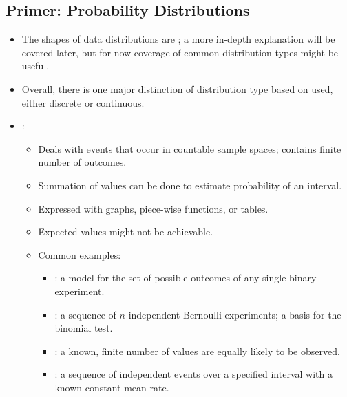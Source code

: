 \begin{itemize}
  \subsection{Primer: Probability Distributions}
  \begin{itemize}
    \item The shapes of data distributions are \hyperref[Subsection: Probability Functions]{}; a more in-depth explanation will be covered later, but for now coverage of common distribution types might be useful.
    \item Overall, there is one major distinction of distribution type based on \hyperref[Subsection: Data Types]{} used, either discrete or continuous.
    \item {}:
      \begin{itemize}
        \item Deals with events that occur in countable sample spaces; contains finite number of outcomes.
        \item Summation of values can be done to estimate probability of an interval.
        \item Expressed with graphs, piece-wise functions, or tables.
        \item Expected values might not be achievable.
        \item Common examples:
        \begin{multicols}{2}
        \begin{itemize}
          \item {}: a model for the set of possible outcomes of any single binary experiment.
          \item {}: a sequence of \(n\) independent Bernoulli experiments; a basis for the binomial test.
          \item {}: a known, finite number of values are equally likely to be observed.
          \item {}: a sequence of independent events over a specified interval with a known constant mean rate.
        \end{itemize}
        \end{multicols}
      \end{itemize}

\end{itemize}
\end{itemize}
